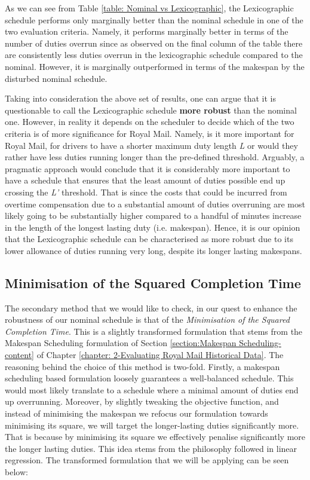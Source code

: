 \vspace{\baselineskip}
\noindent
As we can see from Table \ref{table: Nominal vs Lexicographic}, the Lexicographic schedule performs only marginally better than the nominal schedule in one of the two evaluation criteria. Namely, it performs marginally better in terms of the number of duties overrun since as observed on the final column of the table there are consistently less duties overrun in the lexicographic schedule compared to the nominal. However, it is marginally outperformed in terms of the makespan by the disturbed nominal schedule. 

\vspace{\baselineskip}
\noindent
Taking into consideration the above set of results, one can argue that it is questionable to call the Lexicographic schedule \textbf{more robust} than the nominal one. However, in reality it depends on the scheduler to decide which of the two criteria is of more significance for Royal Mail. Namely, is it more important for Royal Mail, for drivers to have a shorter maximum duty length \textit{L} or would they rather have less duties running longer than the pre-defined threshold. Arguably, a pragmatic approach would conclude that it is considerably more important to have a schedule that ensures that the least amount of duties possible end up crossing the \textit{L'} threshold. That is since the costs that could be incurred from overtime compensation due to a substantial amount of duties overruning are most likely going to be substantially higher compared to a handful of minutes increase in the length of the longest lasting duty (i.e. makespan). Hence, it is our opinion that the Lexicographic schedule can be characterised as more robust due to its lower allowance of duties running very long, despite its longer lasting makespans. 


\subsection*{Minimisation of the Squared Completion Time}
The secondary method that we would like to check, in our quest to enhance the robustness of our nominal schedule is that of the \textit{Minimisation of the Squared Completion Time}. This is a slightly transformed formulation that stems from the Makespan Scheduling formulation of Section \ref{section:Makespan Scheduling-content} of Chapter \ref{chapter: 2-Evaluating Royal Mail Historical Data}. The reasoning behind the choice of this method is two-fold. Firstly, a makespan scheduling based formulation loosely guarantees a well-balanced schedule. This would most likely translate to a schedule where a minimal amount of duties end up overrunning. Moreover, by slightly tweaking the objective function, and instead of minimising the makespan we refocus our formulation towards minimising its square, we will target the longer-lasting duties significantly more. That is because by minimising its square we effectively penalise significantly more the longer lasting duties. This idea stems from the philosophy followed in linear regression. The transformed formulation that we will be applying can be seen below:

